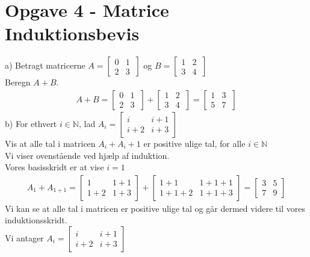 \documentclass[a4paper,10pt]{article}
\begin{document}
\section{Opgave 4 - Matrice Induktionsbevis}
a) Betragt matricerne $A = \begin{bmatrix}
0 & 1 \\ 2 & 3\
\end{bmatrix}$ og $B = \begin{bmatrix}
1 & 2 \\ 3 & 4\
\end{bmatrix}$\\
Beregn $A + B$.
\begin{align*}
A + B = \begin{bmatrix}
0 & 1 \\ 2 & 3\ \end{bmatrix} +
\begin{bmatrix}
1 & 2 \\ 3 & 4\
\end{bmatrix} = \begin{bmatrix}
1 & 3 \\ 5 & 7\
\end{bmatrix}
\end{align*}
b) For ethvert $ i \in \mathbb{N}$, lad $A_i = \begin{bmatrix}
i & i+1 \\ i+2 & i+3
\end{bmatrix}$\\
Vis at alle tal i matricen $A_i + A_i+1$ er positive ulige tal, for alle $i \in \mathbb{N}$\\
Vi viser ovenstående ved hjælp af induktion.\\
Vores basisskridt er at vise $i = 1$
\begin{align*}
A_1+A_{1+1} = \begin{bmatrix}
1 & 1+1 \\ 1+2 & 1+3
\end{bmatrix}+\begin{bmatrix}
1+1 & 1+1+1 \\ 1+1+2 & 1+1+3
\end{bmatrix} = \begin{bmatrix}
3 & 5 \\ 7 & 9
\end{bmatrix}
\end{align*} 
Vi kan se at alle tal i matricen er positive ulige tal og går dermed videre til vores induktionsskridt.\\
Vi antager  $A_i = \begin{bmatrix}
i & i+1 \\ i+2 & i+3
\end{bmatrix}$\\
\end{document}
